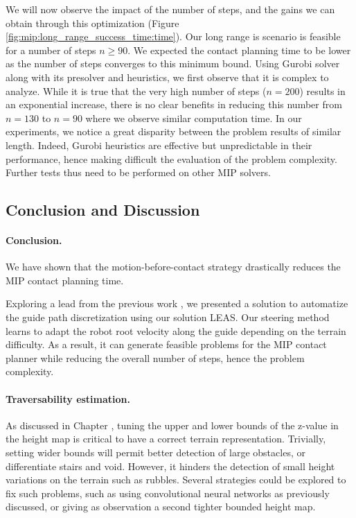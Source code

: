 We will now observe the impact of the number of steps, and the gains we can obtain through this optimization (Figure \ref{fig:mip:long_range_success_time:time}).
Our long range is scenario is feasible for a number of steps $n \geq 90$. We expected the contact planning time to be lower as the number of steps converges to this minimum bound.
Using Gurobi solver along with its presolver and heuristics, we first observe that it is complex to analyze. While it is true that the very high number of steps ($n=200$) results in an exponential increase, there is no clear benefits in reducing this number from $n=130$ to $n=90$ where we observe similar computation time.
In our experiments, we notice a great disparity between the problem results of similar length. Indeed, Gurobi heuristics are effective but unpredictable in their performance, hence making difficult the evaluation of the problem complexity. Further tests thus need to be performed on other MIP solvers.


\subsection{Conclusion and Discussion}
\label{subsub:mip:discussion}
\paragraph{Conclusion.}
We have shown that the motion-before-contact strategy drastically reduces the MIP contact planning time.

Exploring a lead from the previous work \cite{sl1m_v2}, we presented a solution to automatize the guide path discretization using our solution LEAS.
Our steering method learns to adapt the robot root velocity along the guide depending on the terrain difficulty.
As a result, it can generate feasible problems for the MIP contact planner while reducing the overall number of steps, hence the problem complexity.



\paragraph{Traversability estimation.}
As discussed in Chapter \cite{sec:LEAS}, tuning the upper and lower bounds of the z-value in the height map is critical to have a correct terrain representation.
Trivially, setting wider bounds will permit better detection of large obstacles, or differentiate stairs and void. However, it hinders the detection of small height variations on the terrain such as rubbles.
Several strategies could be explored to fix such problems, such as using convolutional neural networks as previously discussed, or giving as observation a second tighter bounded height map.

